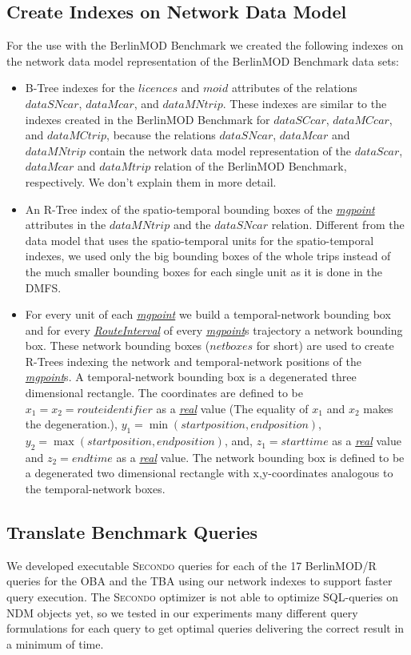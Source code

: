 \documentclass[a4paper]{article}
\newcommand{\secondo}{\textsc{Secondo}}
\newcommand{\bmodb} {BerlinMOD Benchmark}
\newcommand{\dt}[1]{\textsl{\underline{#1}}}
\begin{document}
{\subsection{Create Indexes on Network Data Model}
\label{sec:createIndex}
For the use with the \bmodb{} we created the following indexes on the network
data model representation of the \bmodb{} data sets:
\begin{itemize}
  \item B-Tree indexes for the $licences$ and $moid$ attributes of the relations
$dataSNcar$, $dataMcar$, and $dataMNtrip$. These indexes are similar to the indexes
created in the \bmodb{} for $dataSCcar$, $dataMCcar$, and $dataMCtrip$, because
the relations $dataSNcar$, $dataMcar$ and $dataMNtrip$ contain the network
data model representation of the $dataScar$, $dataMcar$ and $dataMtrip$ relation
of the \bmodb{}, respectively. We don't explain them in more detail.
  \item An R-Tree index of the spatio-temporal bounding boxes of the \dt{mgpoint}
attributes in the $dataMNtrip$ and the $dataSNcar$ relation. Different from the
data model that uses the spatio-temporal units for the spatio-temporal indexes, we
used only the big bounding boxes of the whole trips instead of the much smaller
bounding boxes for each single unit as it is done in the DMFS.
 \item For every unit of each \dt{mgpoint} we build a temporal-network bounding box
and for every \dt{RouteInterval} of every \dt{mgpoint}s trajectory a network bounding box.
These network bounding boxes ($netboxes$ for short) are used to create R-Trees
indexing the network and temporal-network positions of the \dt{mgpoint}s.
A temporal-network bounding box
is a degenerated three dimensional rectangle. The coordinates are defined to be
$x_1 = x_2 = route identifier$ as a \dt{real} value (The equality of $x_1$ and
$x_2$ makes the degeneration.), $y_1 = \min (start position, end position)$,
$y_2 = \max (start position, end position)$,
and, $z_1 = start time$ as a \dt{real} value and $z_2 = end time$ as a \dt{real} value.
The network bounding box is defined to be a degenerated two dimensional rectangle
with x,y-coordinates analogous to the temporal-network boxes.
\end{itemize}
\subsection{Translate Benchmark Queries}
\label{sec:queries}
We developed executable \secondo{} queries for each of the 17 BerlinMOD/R queries
for the OBA and the TBA using our network indexes to support faster query execution.
The \secondo{} optimizer is not able to optimize SQL-queries on NDM objects yet, so we tested in
our experiments many different query formulations for each query to get optimal
queries delivering the correct result in a minimum of time.

}
\end{document}
